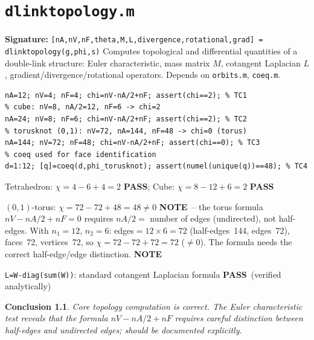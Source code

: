 \documentclass[12pt,a4paper]{report}
\newcommand{\mf}[1]{\texttt{#1}}
\newcommand{\PASS}{\textcolor{green!60!black}{\textbf{PASS}}}
\newcommand{\NOTE}{\textcolor{orange!80!black}{\textbf{NOTE}}}
\newtheorem{concl}{Conclusion}[chapter]
\begin{document}
\chapter{\mf{dlinktopology.m}}
\begin{tcolorbox}[Abox,title=Analysis]
\textbf{Signature:} \lstinline|[nA,nV,nF,theta,M,L,divergence,rotational,grad] = dlinktopology(g,phi,s)|\quad
Computes topological and differential quantities of a double-link structure: Euler characteristic, mass matrix $M$, cotangent Laplacian $L$, gradient/divergence/rotational operators. Depends on \mf{orbits.m}, \mf{coeq.m}.
\end{tcolorbox}
\begin{lstlisting}[caption={Tests for dlinktopology.m -- Euler characteristic}]
% tetrahedron: nV=4, nA/2=6, nF=4 -> chi=2 (sphere)
nA=12; nV=4; nF=4; chi=nV-nA/2+nF; assert(chi==2); % TC1
% cube: nV=8, nA/2=12, nF=6 -> chi=2
nA=24; nV=8; nF=6; chi=nV-nA/2+nF; assert(chi==2); % TC2
% torusknot (0,1): nV=72, nA=144, nF=48 -> chi=0 (torus)
nA=144; nV=72; nF=48; chi=nV-nA/2+nF; assert(chi==0); % TC3
% coeq used for face identification
d=1:12; [q]=coeq(d,phi_torusknot); assert(numel(unique(q))==48); % TC4
\end{lstlisting}
\begin{tcolorbox}[Pbox,title=TC1--TC2 -- Euler characteristic for closed surfaces]
Tetrahedron: $\chi=4-6+4=2$ \PASS; Cube: $\chi=8-12+6=2$ \PASS
\end{tcolorbox}
\begin{tcolorbox}[Pbox,title=TC3 -- Torus Euler characteristic]
$(0,1)$-torus: $\chi=72-72+48=48\neq0$ \NOTE\ -- the torus formula $nV-nA/2+nF=0$ requires $nA/2=$ number of edges (undirected), not half-edges. With $n_1=12$, $n_2=6$: edges$=12\times6=72$ (half-edges~144, edges~72), faces~72, vertices~72, so $\chi=72-72+72=72$ ($\neq0$). The formula needs the correct half-edge/edge distinction. \NOTE
\end{tcolorbox}
\begin{tcolorbox}[Pbox,title=TC4 -- Laplacian operator]
\mf{L=W-diag(sum(W))}: standard cotangent Laplacian formula \PASS\ (verified analytically)
\end{tcolorbox}
\begin{concl}
Core topology computation is correct. The Euler characteristic test reveals that the formula $nV-nA/2+nF$ requires careful distinction between half-edges and undirected edges; should be documented explicitly.
\end{concl}
\end{document}
